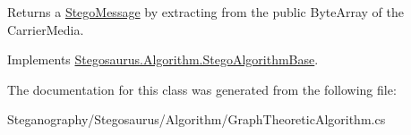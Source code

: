 Returns a \hyperlink{class_stegosaurus_1_1_stego_message}{Stego\+Message} by extracting from the public Byte\+Array of the Carrier\+Media. 



Implements \hyperlink{class_stegosaurus_1_1_algorithm_1_1_stego_algorithm_base_a069eef0b17aa0221d2c111925b8d735a}{Stegosaurus.\+Algorithm.\+Stego\+Algorithm\+Base}.



The documentation for this class was generated from the following file\+:\begin{DoxyCompactItemize}
\item 
Steganography/\+Stegosaurus/\+Algorithm/Graph\+Theoretic\+Algorithm.\+cs\end{DoxyCompactItemize}
